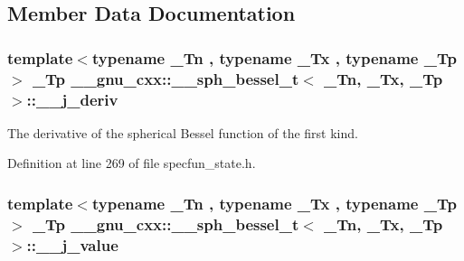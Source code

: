 \subsection{Member Data Documentation}
\subsubsection[{\texorpdfstring{\+\_\+\+\_\+j\+\_\+deriv}{__j_deriv}}]{\setlength{\rightskip}{0pt plus 5cm}template$<$typename \+\_\+\+Tn , typename \+\_\+\+Tx , typename \+\_\+\+Tp $>$ \+\_\+\+Tp {\bf \+\_\+\+\_\+gnu\+\_\+cxx\+::\+\_\+\+\_\+sph\+\_\+bessel\+\_\+t}$<$ \+\_\+\+Tn, \+\_\+\+Tx, \+\_\+\+Tp $>$\+::\+\_\+\+\_\+j\+\_\+deriv}\hypertarget{struct____gnu__cxx_1_1____sph__bessel__t_af89f13e97d771e4cb18f69ea88056ee6}{}\label{struct____gnu__cxx_1_1____sph__bessel__t_af89f13e97d771e4cb18f69ea88056ee6}


The derivative of the spherical Bessel function of the first kind. 



Definition at line 269 of file specfun\+\_\+state.\+h.

\subsubsection[{\texorpdfstring{\+\_\+\+\_\+j\+\_\+value}{__j_value}}]{\setlength{\rightskip}{0pt plus 5cm}template$<$typename \+\_\+\+Tn , typename \+\_\+\+Tx , typename \+\_\+\+Tp $>$ \+\_\+\+Tp {\bf \+\_\+\+\_\+gnu\+\_\+cxx\+::\+\_\+\+\_\+sph\+\_\+bessel\+\_\+t}$<$ \+\_\+\+Tn, \+\_\+\+Tx, \+\_\+\+Tp $>$\+::\+\_\+\+\_\+j\+\_\+value}\hypertarget{struct____gnu__cxx_1_1____sph__bessel__t_ace4d11f6823cddc49f8f9855298d9eac}{}\label{struct____gnu__cxx_1_1____sph__bessel__t_ace4d11f6823cddc49f8f9855298d9eac}


